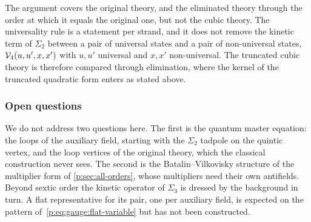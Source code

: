 The argument covers the original theory, and the eliminated theory through the order at which it equals the original one, but not the cubic theory.
The universality rule is a statement per strand, and it does not remove the kinetic term of $\Sigma_2$ between a pair of universal states and a pair of non-universal states, $\mathcal{V}_{4}(u, u', x, x')$ with $u, u'$ universal and $x, x'$ non-universal.
The truncated cubic theory is therefore compared through elimination, where the kernel of the truncated quadratic form enters as stated above.

\subsubsection{Open questions}
\label{p:sec:gauge:open}


We do not address two questions here.
The first is the quantum master equation: the loops of the auxiliary field, starting with the $\Sigma_2$ tadpole on the quintic vertex, and the loop vertices of the original theory, which the classical construction never sees.
The second is the Batalin--Vilkovisky structure of the multiplier form of \cref{p:sec:all-orders}, whose multipliers need their own antifields.
Beyond sextic order the kinetic operator of $\Sigma_3$ is dressed by the background in turn.
A flat representative for its pair, one per auxiliary field, is expected on the pattern of~\eqref{p:eq:gauge:flat-variable} but has not been constructed.
